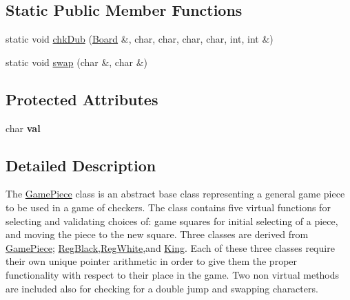 \subsection*{Static Public Member Functions}
\begin{DoxyCompactItemize}
\item 
static void \hyperlink{class_game_piece_a8b8da20636f496d24aaeafcad6740a99}{chk\-Dub} (\hyperlink{class_board}{Board} \&, char, char, char, char, int, int \&)
\item 
static void \hyperlink{class_game_piece_ad97f1a0c21c5acef771eb4d498519bbf}{swap} (char \&, char \&)
\end{DoxyCompactItemize}
\subsection*{Protected Attributes}
\begin{DoxyCompactItemize}
\item 
\hypertarget{class_game_piece_a50f25eea65caa0c2cd67413e70fe8700}{char {\bfseries val}}\label{class_game_piece_a50f25eea65caa0c2cd67413e70fe8700}

\end{DoxyCompactItemize}


\subsection{Detailed Description}
The \hyperlink{class_game_piece}{Game\-Piece} class is an abstract base class representing a general game piece to be used in a game of checkers. The class contains five virtual functions for selecting and validating choices of\-: game squares for initial selecting of a piece, and moving the piece to the new square. Three classes are derived from \hyperlink{class_game_piece}{Game\-Piece}; \hyperlink{class_reg_black}{Reg\-Black},\hyperlink{class_reg_white}{Reg\-White},and \hyperlink{class_king}{King}. Each of these three classes require their own unique pointer arithmetic in order to give them the proper functionality with respect to their place in the game. Two non virtual methods are included also for checking for a double jump and swapping characters. 

